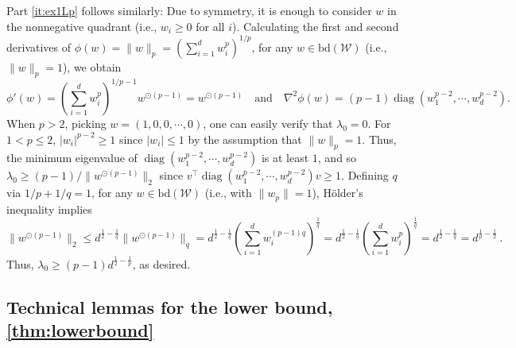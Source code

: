 \documentclass[english]{article}
\newcommand{\cW}{\mathcal{W}}
\newcommand{\bd}{\mathrm{bd}}
\DeclareMathOperator{\diag}{diag}
\newenvironment{proofof}[1]{\par\noindent{\bf Proof of #1\ }}{\hfill\BlackBox\\[2mm]}
\begin{document}
\begin{proofof}{\cref{ex:curvature}}
Part \eqref{it:ex1Lp} follows similarly: Due to symmetry, it is enough to consider $w$ in the nonnegative quadrant (i.e., $w_i \ge 0$ for all $i$). Calculating the first and second derivatives of $\phi(w)=\|w\|_p = \left(\sum_{i=1}^{d}w_i^p\right)^{1/p}$, for any $w \in \bd(\cW)$ (i.e., $\|w\|_p=1$), we obtain
\[
\phi'(w) = \left(\sum_{i=1}^{d} w_i^p\right)^{1/p-1}w^{\odot (p-1)} = w^{\odot(p-1)}
\quad \text{and} \quad
\nabla^2\phi(w) =  (p-1) \diag\left(w_1^{p-2},\cdots,w_d^{p-2}\right).
\]
When $p>2$, picking $w = (1,0,0,\cdots, 0)$, one can easily verify that $\lambda_0 = 0$. For $1<p\le 2$, $|w_i|^{p-2} \ge 1$ since $|w_i| \le 1$ by the assumption that $\|w\|_p = 1$. Thus, the minimum eigenvalue of $\diag\left(w_1^{p-2},\cdots,w_d^{p-2}\right)$ is at least $1$, and so $\lambda_0 \ge (p-1)/\|w^{\odot(p-1)}\|_2$ since $ v^\top \diag\left(w_1^{p-2},\cdots,w_d^{p-2}\right) v \ge 1$.
Defining $q$ via $1/p+1/q=1$, for any $w \in \bd(\cW)$ (i.e., with $\|w_p\|=1$), H\"older's inequality implies
\[
\|w^{\odot(p-1)}\|_2 \le d^{\frac{1}{2}-\frac{1}{q}} \|w^{\odot(p-1)}\|_q = d^{\frac{1}{2}-\frac{1}{q}}  \left(\sum_{i=1}^d w_i^{(p-1)q}\right)^\frac{1}{q}
= d^{\frac{1}{2}-\frac{1}{q}}  \left(\sum_{i=1}^d w_i^{p}\right)^\frac{1}{q} = d^{\frac{1}{2}-\frac{1}{q}}  = d^{\frac{1}{p}-\frac{1}{2}}~.
\]
Thus, $\lambda_0 \ge (p-1)d^{\frac{1}{2}-\frac{1}{p}}$, as desired.
\end{proofof}



\subsection{Technical lemmas for the lower bound, \cref{thm:lowerbound}}
\label{sec:pr-lowerbound}
\end{document}
